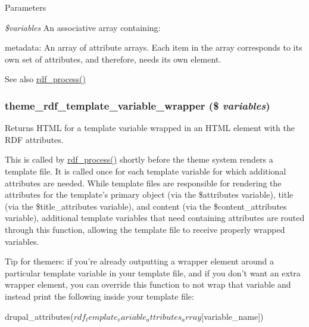  
\begin{DoxyParams}{Parameters}
\item[{\em \$variables}]An associative array containing:
\begin{DoxyItemize}
\item metadata: An array of attribute arrays. Each item in the array corresponds to its own set of attributes, and therefore, needs its own element.
\end{DoxyItemize}\end{DoxyParams}
\begin{DoxySeeAlso}{See also}
\hyperlink{rdf_8module_a33cf33f554fea60776a23c543557ff7b}{rdf\_\-process()} 
\end{DoxySeeAlso}
\hypertarget{group__rdf_ga3bb0346c634262f7b193957cc26d38ca}{
\subsubsection[{theme\_\-rdf\_\-template\_\-variable\_\-wrapper}]{\setlength{\rightskip}{0pt plus 5cm}theme\_\-rdf\_\-template\_\-variable\_\-wrapper (\$ {\em variables})}}
\label{group__rdf_ga3bb0346c634262f7b193957cc26d38ca}
Returns HTML for a template variable wrapped in an HTML element with the RDF attributes.

This is called by \hyperlink{rdf_8module_a33cf33f554fea60776a23c543557ff7b}{rdf\_\-process()} shortly before the theme system renders a template file. It is called once for each template variable for which additional attributes are needed. While template files are responsible for rendering the attributes for the template's primary object (via the \$attributes variable), title (via the \$title\_\-attributes variable), and content (via the \$content\_\-attributes variable), additional template variables that need containing attributes are routed through this function, allowing the template file to receive properly wrapped variables.

Tip for themers: if you're already outputting a wrapper element around a particular template variable in your template file, and if you don't want an extra wrapper element, you can override this function to not wrap that variable and instead print the following inside your template file: 
\begin{DoxyCode}
   drupal_attributes($rdf_template_variable_attributes_array[$variable_name])
\end{DoxyCode}



